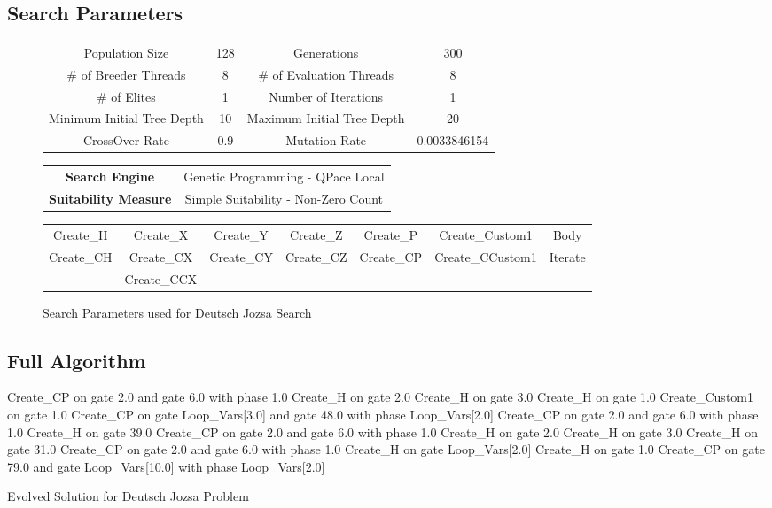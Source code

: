 \subsection{Search Parameters}
\label{sec:deutschjozsasearchparams}

\begin{figure}[h!]
\begin{center}
 \begin{tabular}{|cc|cc|}
\hline
  Population Size & 128 & Generations & 300 \\
  \# of Breeder Threads & 8 & \# of Evaluation Threads & 8 \\
  \# of Elites & 1 & Number of Iterations & 1 \\
  Minimum Initial Tree Depth & 10 & Maximum Initial Tree Depth & 20 \\
  CrossOver Rate & 0.9 & Mutation Rate & 0.0033846154 \\
\hline
 \end{tabular}
 \begin{tabular}{cc}
  \textbf{Search Engine} & Genetic Programming - QPace Local \\
  \textbf{Suitability Measure} & Simple Suitability - Non-Zero Count \\
 \end{tabular}
\begin{tabular}{|ccccccc|}
\hline
  Create\_H & Create\_X& Create\_Y& Create\_Z & Create\_P & Create\_Custom1 & Body \\
  Create\_CH & Create\_CX & Create\_CY & Create\_CZ & Create\_CP & Create\_CCustom1 & Iterate \\
   & Create\_CCX &  & &  &  &  \\
\hline
 \end{tabular}
\end{center}
\caption{Search Parameters used for Deutsch Jozsa Search}
\label{fig:deutschjozsaparams}
\end{figure}

\subsection{Full Algorithm}
\label{sec:DeutschJozsaExpAppFullAlg}

\begin{algorithm}
 \begin{algorithmic}
\STATE Create\_CP on gate 2.0 and gate 6.0 with phase 1.0
\STATE Create\_H on gate 2.0
\STATE Create\_H on gate 3.0
\STATE Create\_H on gate 1.0
\STATE Create\_Custom1 on gate 1.0
\STATE Create\_CP on gate Loop\_Vars[3.0] and gate 48.0 with phase Loop\_Vars[2.0]
\STATE Create\_CP on gate 2.0 and gate 6.0 with phase 1.0
\STATE Create\_H on gate 39.0
\STATE Create\_CP on gate 2.0 and gate 6.0 with phase 1.0
\STATE Create\_H on gate 2.0
\STATE Create\_H on gate 3.0
\STATE Create\_H on gate 31.0
\STATE Create\_CP on gate 2.0 and gate 6.0 with phase 1.0
\STATE Create\_H on gate Loop\_Vars[2.0]
\STATE Create\_H on gate 1.0
\STATE Create\_CP on gate 79.0 and gate Loop\_Vars[10.0] with phase Loop\_Vars[2.0]
 \end{algorithmic}
\caption{Evolved Solution for Deutsch Jozsa Problem}
\label{alg:evodeutschjozsa}
\end{algorithm}


